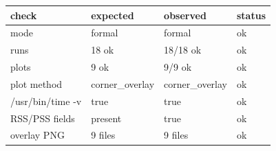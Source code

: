 \begin{tabular}{llll}
\toprule
check & expected & observed & status \\
\midrule
mode & formal & formal & ok \\
runs & 18 ok & 18/18 ok & ok \\
plots & 9 ok & 9/9 ok & ok \\
plot method & corner\_overlay & corner\_overlay & ok \\
/usr/bin/time -v & true & true & ok \\
RSS/PSS fields & present & true & ok \\
overlay PNG & 9 files & 9 files & ok \\
\bottomrule
\end{tabular}
